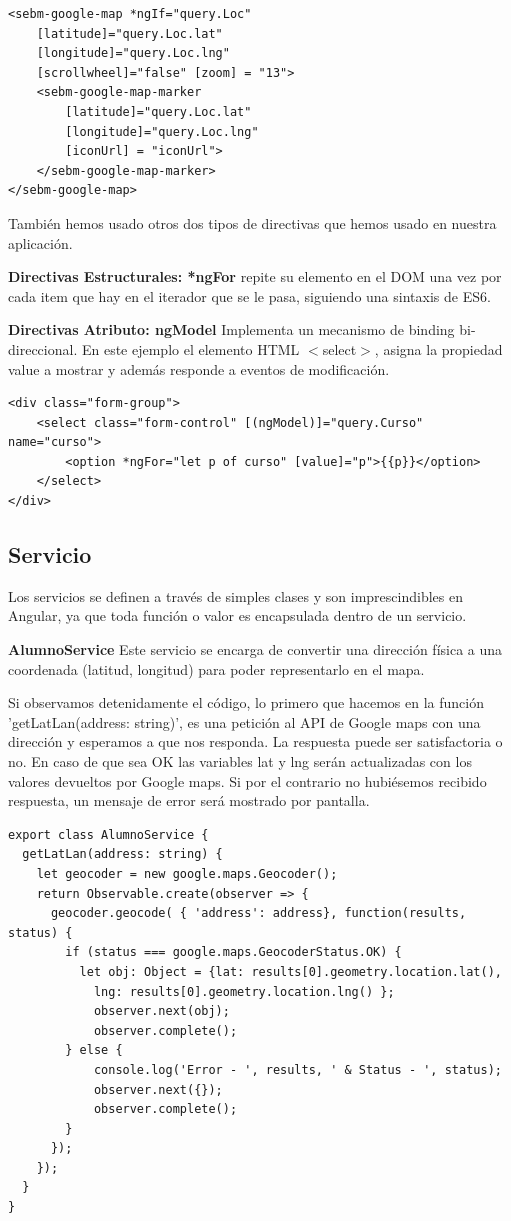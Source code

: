 \begin{lstlisting}
<sebm-google-map *ngIf="query.Loc"
    [latitude]="query.Loc.lat"
    [longitude]="query.Loc.lng"
    [scrollwheel]="false" [zoom] = "13">
    <sebm-google-map-marker
        [latitude]="query.Loc.lat"
        [longitude]="query.Loc.lng"
        [iconUrl] = "iconUrl">
    </sebm-google-map-marker>
</sebm-google-map>
\end{lstlisting}

También hemos usado otros dos tipos de directivas que hemos usado en nuestra aplicación.

\textbf{Directivas Estructurales: *ngFor} repite su elemento en el DOM una vez por cada item que hay en el iterador que se le pasa, siguiendo una sintaxis de ES6.

\textbf{Directivas Atributo: ngModel} Implementa un mecanismo de binding bi-direccional. En este ejemplo el elemento HTML $<$select$>$, asigna la propiedad value a mostrar y además responde a eventos de modificación.
\begin{lstlisting}
<div class="form-group">
    <select class="form-control" [(ngModel)]="query.Curso" name="curso">
        <option *ngFor="let p of curso" [value]="p">{{p}}</option>
    </select>
</div>
\end{lstlisting}

\subsection{Servicio } Los servicios se definen a través de simples clases y son imprescindibles en Angular, ya que toda función o valor es encapsulada dentro de un servicio.

\textbf{AlumnoService} Este servicio se encarga de convertir una dirección física a una coordenada (latitud, longitud) para poder representarlo en el mapa.

Si observamos detenidamente el código, lo primero que hacemos en la función 'getLatLan(address: string)', es una petición al API de Google maps con una dirección y esperamos a que nos responda. La respuesta puede ser satisfactoria o no. En caso de que sea OK las variables lat y lng serán actualizadas con los valores devueltos por Google maps. Si por el contrario no hubiésemos recibido respuesta, un mensaje de error será mostrado por pantalla.
\begin{lstlisting}
export class AlumnoService {
  getLatLan(address: string) {
    let geocoder = new google.maps.Geocoder();
    return Observable.create(observer => {
      geocoder.geocode( { 'address': address}, function(results, status) {
        if (status === google.maps.GeocoderStatus.OK) {
          let obj: Object = {lat: results[0].geometry.location.lat(),
            lng: results[0].geometry.location.lng() };
            observer.next(obj);
            observer.complete();
        } else {
            console.log('Error - ', results, ' & Status - ', status);
            observer.next({});
            observer.complete();
        }
      });
    });
  }
}
\end{lstlisting}

